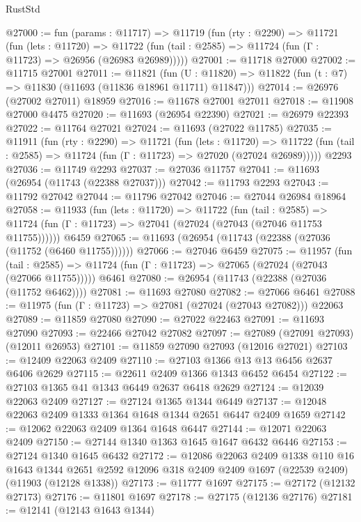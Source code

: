 \begin{lexlean}{RustStd}
\begin{coremodule}
@27000 := fun (params : @11717) =>
  @11719
    (fun (rty : @2290) =>
    @11721
      (fun (lets : @11720) =>
      @11722 (fun (tail : @2585) => @11724 (fun (Γ : @11723) => @26956 (@26983 @26989)))))
@27001 := @11718 @27000
@27002 := @11715 @27001
@27011 := @11821
    (fun (U : @11820) => @11822 (fun (t : @7) => @11830 (@11693 (@11836 @18961 @11711) @11847)))
@27014 := @26976 (@27002 @27011) @18959
@27016 := @11678 @27001 @27011
@27018 := @11908 @27000 @4475
@27020 := @11693 (@26954 @22390)
@27021 := @26979 @22393
@27022 := @11764 @27021
@27024 := @11693 (@27022 @11785)
@27035 := @11911
    (fun (rty : @2290) =>
    @11721
      (fun (lets : @11720) =>
      @11722 (fun (tail : @2585) => @11724 (fun (Γ : @11723) => @27020 (@27024 @26989)))))
    @2293
@27036 := @11749 @2293
@27037 := @27036 @11757
@27041 := @11693 (@26954 (@11743 (@22388 @27037)))
@27042 := @11793 @2293
@27043 := @11792 @27042
@27044 := @11796 @27042
@27046 := @27044 @26984 @18964
@27058 := @11933
    (fun (lets : @11720) =>
    @11722
      (fun (tail : @2585) =>
      @11724 (fun (Γ : @11723) => @27041 (@27024 (@27043 (@27046 @11753 @11755))))))
    @6459
@27065 := @11693 (@26954 (@11743 (@22388 (@27036 (@11752 (@6460 @11755))))))
@27066 := @27046 @6459
@27075 := @11957
    (fun (tail : @2585) => @11724 (fun (Γ : @11723) => @27065 (@27024 (@27043 (@27066 @11755)))))
    @6461
@27080 := @26954 (@11743 (@22388 (@27036 (@11752 @6462))))
@27081 := @11693 @27080
@27082 := @27066 @6461
@27088 := @11975 (fun (Γ : @11723) => @27081 (@27024 (@27043 @27082))) @22063
@27089 := @11859 @27080
@27090 := @27022 @22463
@27091 := @11693 @27090
@27093 := @22466 @27042 @27082
@27097 := @27089 (@27091 @27093) (@12011 @26953)
@27101 := @11859 @27090 @27093 (@12016 @27021)
@27103 := @12409 @22063 @2409
@27110 := @27103 @1366 @13 @13 @6456 @2637 @6406 @2629
@27115 := @22611 @2409 @1366 @1343 @6452 @6454
@27122 := @27103 @1365 @41 @1343 @6449 @2637 @6418 @2629
@27124 := @12039 @22063 @2409
@27127 := @27124 @1365 @1344 @6449
@27137 := @12048 @22063 @2409 @1333 @1364 @1648 @1344 @2651 @6447 @2409 @1659
@27142 := @12062 @22063 @2409 @1364 @1648 @6447
@27144 := @12071 @22063 @2409
@27150 := @27144 @1340 @1363 @1645 @1647 @6432 @6446
@27153 := @27124 @1340 @1645 @6432
@27172 := @12086
    @22063
    @2409
    @1338
    @110
    @16
    @1643
    @1344
    @2651
    @2592
    @12096
    @318
    @2409
    @2409
    @1697
    (@22539 @2409)
    (@11903 (@12128 @1338))
@27173 := @11777 @1697
@27175 := @27172 (@12132 @27173)
@27176 := @11801 @1697
@27178 := @27175 (@12136 @27176)
@27181 := @12141 (@12143 @1643 @1344)

\end{coremodule}
\end{lexlean}
